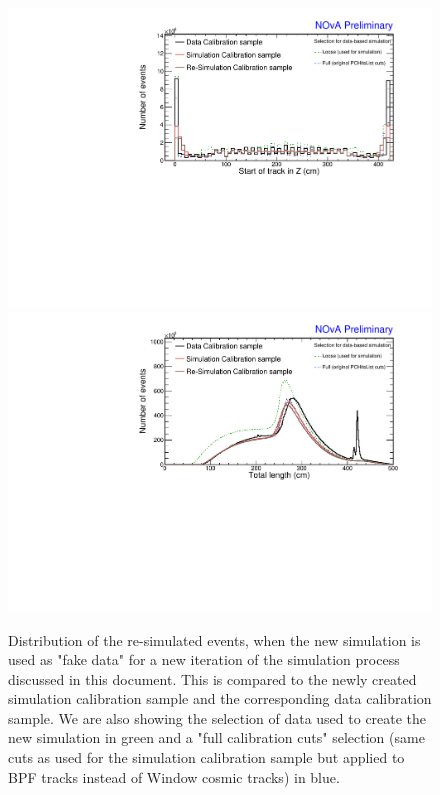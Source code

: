 \begin{figure}[!ht]
\includegraphics[width=\textwidth]{Plots/TBCalibration/DBSim_SimVersionComparison_StartZ.pdf}
\includegraphics[width=\textwidth]{Plots/TBCalibration/DBSim_SimVersionComparison_TotLength.pdf}
\caption[Comparison of simulation to a circular re-simulation validation sample]{Distribution of the re-simulated events, when the new simulation is used as "fake data" for a new iteration of the simulation process discussed in this document. This is compared to the newly created simulation calibration sample and the corresponding data calibration sample. We are also showing the selection of data used to create the new simulation in green and a "full calibration cuts" selection (same cuts as used for the simulation calibration sample but applied to \acrshort{BPF} tracks instead of Window cosmic tracks) in blue.}
\label{fig:DataBasedSimSimVersionComparison}
\end{figure}

